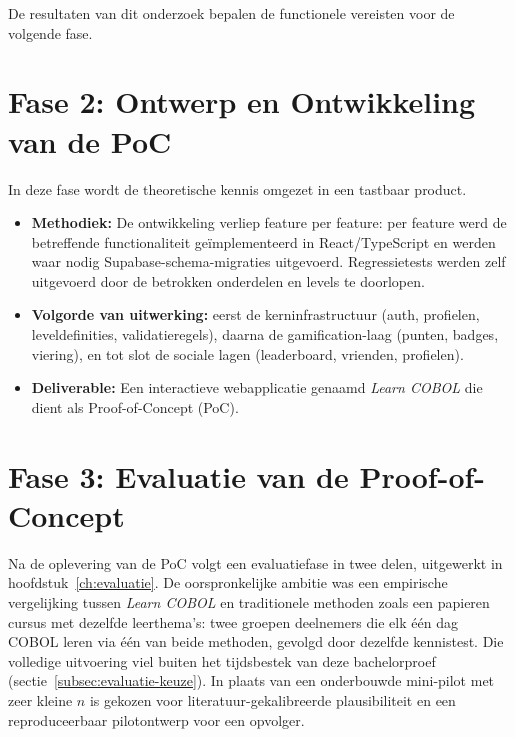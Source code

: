 De resultaten van dit onderzoek bepalen de functionele vereisten voor de volgende fase.

\section{Fase 2: Ontwerp en Ontwikkeling van de PoC}
In deze fase wordt de theoretische kennis omgezet in een tastbaar product.
\begin{itemize}
    \item \textbf{Methodiek:} De ontwikkeling verliep feature per feature: per feature werd de betreffende functionaliteit geïmplementeerd in React/TypeScript en werden waar nodig Supabase-schema-migraties uitgevoerd. Regressietests werden zelf uitgevoerd door de betrokken onderdelen en levels te doorlopen.
    \item \textbf{Volgorde van uitwerking:} eerst de kerninfrastructuur (auth, profielen, leveldefinities, validatieregels), daarna de gamification-laag (punten, badges, viering), en tot slot de sociale lagen (leaderboard, vrienden, profielen).
    \item \textbf{Deliverable:} Een interactieve webapplicatie genaamd \textit{Learn COBOL} die dient als Proof-of-Concept (PoC).
\end{itemize}

\section{Fase 3: Evaluatie van de Proof-of-Concept}
\label{sec:methodologie-fase3}

Na de oplevering van de PoC volgt een evaluatiefase in twee delen, uitgewerkt in hoofdstuk~\ref{ch:evaluatie}.
De oorspronkelijke ambitie was een empirische vergelijking tussen \textit{Learn COBOL} en traditionele methoden zoals een papieren cursus met dezelfde leerthema's: twee groepen deelnemers die elk één dag COBOL leren via één van beide methoden, gevolgd door dezelfde kennistest.
Die volledige uitvoering viel buiten het tijdsbestek van deze bachelorproef (sectie~\ref{subsec:evaluatie-keuze}).
In plaats van een onderbouwde mini-pilot met zeer kleine \(n\) is gekozen voor literatuur-gekalibreerde plausibiliteit en een reproduceerbaar pilotontwerp voor een opvolger.

